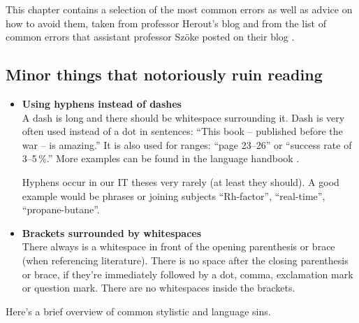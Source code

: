 This chapter contains a selection of the most common errors as well as advice on how to avoid them, taken from professor Herout's blog \cite{Herout} and from the list of common errors that assistant professor Szöke posted on their blog \cite{chyby}.

\subsection*{Minor things that notoriously ruin reading}

\begin{itemize}
	\item{
		\textbf{Using hyphens instead of dashes} \\
		A dash is long and there should be whitespace surrounding it. Dash is very often used instead of a dot in sentences: ``This book -- published before the war -- is amazing.'' It is also used for ranges: 	``page 23--26'' or ``success rate of 3--5\,\%.'' More examples can be found in the language handbook \cite{prirucka}.

Hyphens occur in our IT theses very rarely (at least they should). A good example would be phrases or joining subjects ``Rh-factor'', ``real-time'', ``propane-butane''.
	}
    \item{
    	\textbf{Brackets surrounded by whitespaces} \\
        There always is a whitespace in front of the opening parenthesis or brace (when referencing literature). There is no space after the closing parenthesis or brace, if they're immediately followed by a dot, comma, exclamation mark or question mark. There are no whitespaces inside the brackets.
    }
\end{itemize}

\noindent Here's a brief overview of common stylistic and language sins.

